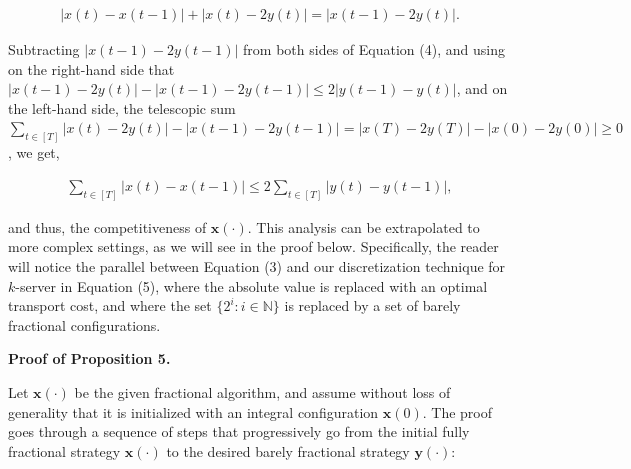 \[\begin{gathered}
|x(t)-x(t-1)|+|x(t)-2y(t)|=|x(t-1)-2y(t)|.
\end{gathered}\]


Subtracting $|x(t-1)-2y(t-1)|$ from both sides of Equation (4), and using on the right-hand side that $|x(t-1)-2y(t)|-|x(t-1)-2y(t-1)|\leq 2|y(t-1)-y(t)|$, and on the left-hand side, the telescopic sum $\sum_{t\in[T]}|x(t)-2y(t)|-|x(t-1)-2y(t-1)|=|x(T)-2y(T)|-|x(0)-2y(0)|\geq 0$, we get,\par


\[\begin{gathered}
\sum_{t\in[T]}|x(t)-x(t-1)|\leq 2\sum_{t\in[T]}|y(t)-y(t-1)|,
\end{gathered}\]


and thus, the competitiveness of ${\boldsymbol{x}}(\cdot)$.
This analysis can be extrapolated to more complex settings, as we will see in the proof below. Specifically, the reader will notice the parallel between Equation (3) and our discretization technique for $k$-server in Equation (5), where the absolute value is replaced with an optimal transport cost, and where the set $\{2^{i}\colon i\in\mathbb{N}\}$ is replaced by a set of barely fractional configurations.\par





\par\medskip\noindent\textbf{Proof of Proposition 5.}\par




Let ${\boldsymbol{x}}(\cdot)$ be the given fractional algorithm, and assume without loss of generality that it is initialized with an integral configuration ${\boldsymbol{x}}(0)$. The proof goes through a sequence of steps that progressively go from the initial fully fractional strategy ${\boldsymbol{x}}(\cdot)$ to the desired barely fractional strategy ${\boldsymbol{y}}(\cdot)$:\par


